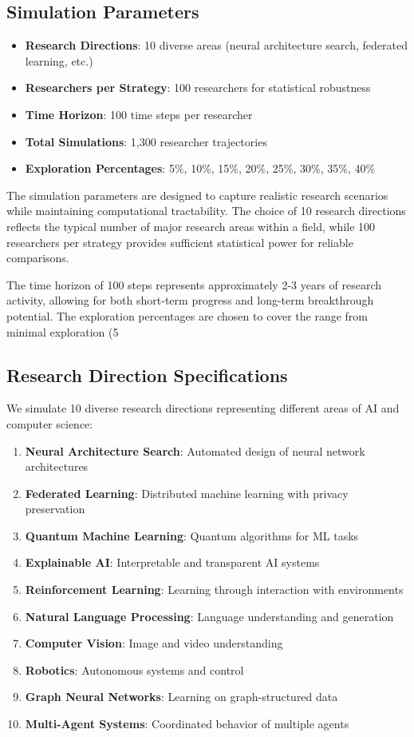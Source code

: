 \documentclass[letterpaper]{article} %
\begin{document}
\subsection{Simulation Parameters}

\begin{itemize}
\item \textbf{Research Directions}: 10 diverse areas (neural architecture search, federated learning, etc.)
\item \textbf{Researchers per Strategy}: 100 researchers for statistical robustness
\item \textbf{Time Horizon}: 100 time steps per researcher
\item \textbf{Total Simulations}: 1,300 researcher trajectories
\item \textbf{Exploration Percentages}: 5\%, 10\%, 15\%, 20\%, 25\%, 30\%, 35\%, 40\%
\end{itemize}

The simulation parameters are designed to capture realistic research scenarios while maintaining computational tractability. The choice of 10 research directions reflects the typical number of major research areas within a field, while 100 researchers per strategy provides sufficient statistical power for reliable comparisons.

The time horizon of 100 steps represents approximately 2-3 years of research activity, allowing for both short-term progress and long-term breakthrough potential. The exploration percentages are chosen to cover the range from minimal exploration (5%

\subsection{Research Direction Specifications}

We simulate 10 diverse research directions representing different areas of AI and computer science:

\begin{enumerate}
\item \textbf{Neural Architecture Search}: Automated design of neural network architectures
\item \textbf{Federated Learning}: Distributed machine learning with privacy preservation
\item \textbf{Quantum Machine Learning}: Quantum algorithms for ML tasks
\item \textbf{Explainable AI}: Interpretable and transparent AI systems
\item \textbf{Reinforcement Learning}: Learning through interaction with environments
\item \textbf{Natural Language Processing}: Language understanding and generation
\item \textbf{Computer Vision}: Image and video understanding
\item \textbf{Robotics}: Autonomous systems and control
\item \textbf{Graph Neural Networks}: Learning on graph-structured data
\item \textbf{Multi-Agent Systems}: Coordinated behavior of multiple agents
\end{enumerate}
\end{document}
